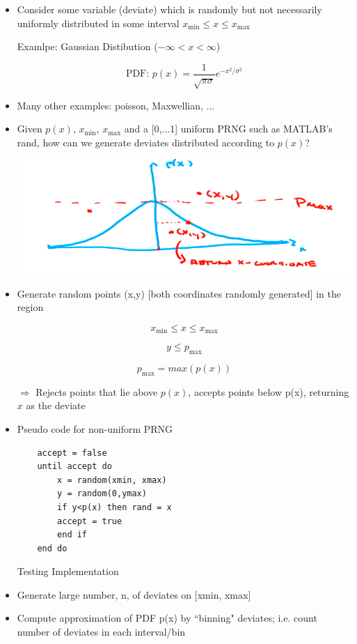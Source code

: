 \begin{itemize}
    \item Consider some variable (deviate) which is randomly but not necessarily uniformly distributed in some interval $x_{\text{min}} \le x \le x_{\text{max}}$

    Examlpe: Gaussian Distibution ($-\infty < x < \infty$)


    \[ \text{PDF: } p(x) = \frac{1}{\sqrt{\pi \sigma}}e^{-x^2/\sigma^2}\]

    \item Many other examples: poisson, Maxwellian, ...

    \item Given $p(x)$, $x_{\text{min}}$, $x_{\text{max}}$ and a [0,...1] uniform PRNG such as MATLAB's rand, how can we generate deviates distributed according to $p(x)$?

    \includegraphics[width = 0.6 \linewidth]{Images/non_uniform_PRNG.png}

    \item Generate random points (x,y) [both coordinates randomly generated] in the region

    \[ x_{\text{min}} \le x \le x_{\text{max}} \]

    \[ y \le p_{\text{max}}\]

    \[ p_{\text{max}} = max(p(x))\]

    $\Rightarrow$ Rejects points that lie above $p(x)$, accepts points below p(x), returning $x$ as the deviate 

    \item Pseudo code for non-uniform PRNG

    \begin{verbatim}
    accept = false
    until accept do
        x = random(xmin, xmax)
        y = random(0,ymax)
        if y<p(x) then rand = x 
        accept = true
        end if
    end do
    \end{verbatim}

    Testing Implementation

    \item Generate large number, n, of deviates on [xmin, xmax]

    \item Compute approximation of PDF p(x) by ``binning" deviates; i.e. count number of deviates in each interval/bin


\end{itemize}
